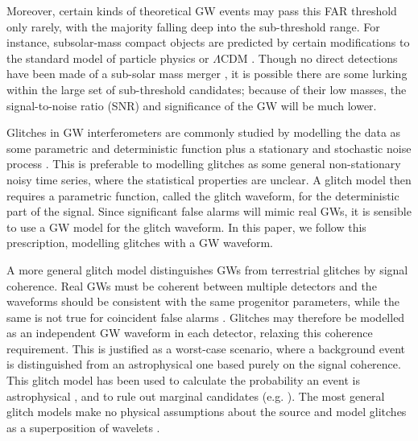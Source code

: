 \begin{refsection}
Moreover, certain kinds of theoretical GW events may pass this FAR threshold only rarely, with the majority falling deep into the sub-threshold range. For instance, subsolar-mass compact objects are predicted by certain modifications to the standard model of particle physics or $\Lambda$CDM \citep{2018PhRvL.120x1102S,2021ApJ...915...54N,2023MNRAS.tmp..611A}. Though no direct detections have been made of a sub-solar mass merger \citep{2019PhRvL.123p1102A, 2021ApJ...915...54N}, it is possible there are some lurking within the large set of sub-threshold candidates; because of their low masses, the signal-to-noise ratio (SNR) and significance of the GW will be much lower.

Glitches in GW interferometers are commonly studied by modelling the data as some parametric and deterministic function plus a stationary and stochastic noise process \citep{2015CQGra..32m5012C, 2021PhRvD.104j2004M, 2023arXiv230110491T,2023ApPhL.122i4103U}. This is preferable to modelling glitches as some general non-stationary noisy time series, where the statistical properties are unclear. A glitch model then requires a parametric function, called the glitch waveform, for the deterministic part of the signal. Since significant false alarms will mimic real GWs, it is sensible to use a GW model for the glitch waveform. In this paper, we follow this prescription, modelling glitches with a GW waveform. 

A more general glitch model distinguishes GWs from terrestrial glitches by signal coherence. Real GWs must be coherent between multiple detectors and the waveforms should be consistent with the same progenitor parameters, while the same is not true for coincident false alarms \citep{2010PhRvD..81f2003V}. Glitches may therefore be modelled as an independent GW waveform in each detector, relaxing this coherence requirement. This is justified as a worst-case scenario, where a background event is distinguished from an astrophysical one based purely on the signal coherence. This glitch model has been used to calculate the probability an event is astrophysical \citep{2018PhRvD..98d2007I, 2019PhRvD.100l3018A,2021PhRvD.104l4039P}, and to rule out marginal candidates (e.g. \citealt{2020MNRAS.498.1905A, 2022MNRAS.516.5309V}). 
The most general glitch models make no physical assumptions about the source and model glitches as a superposition of wavelets \citep{2015CQGra..32m5012C}.


\end{refsection}

